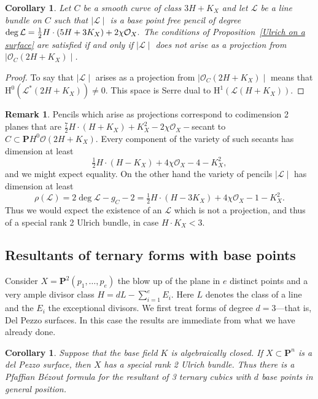 \documentclass{jams-l}
\newtheorem{corollary}[theorem]{Corollary}
\theoremstyle{definition}
\newtheorem{furtherwork}[theorem]{Remark}
\theoremstyle{remark}
\newcommand{\Hrm}{{\mathrm H}}
\newcommand{\cL}{{\mathcal L}}
\newcommand{\cO}{{\mathcal O}}
\newcommand{\PP}{{\mathbf P}}
\begin{document}
\begin{corollary} 
Let $C$ be a smooth curve of class $3H+K_X$ and let $\cL$ be a
\linebreak line
bundle on $C$ such that $\mid \cL \mid$ is a base point free pencil
of degree 
$
\deg \cL \linebreak = {1\over2} H\cdot(5H+3K_X) + 2\chi\cO_X.
$
The conditions of Proposition~\ref{Ulrich on a surface} are satisfied
if and only if $\mid \cL \mid$ does not arise as a projection
from $\mid \cO_C(2H+K_X) \mid$.
\end{corollary}

\begin{proof} To say that $\mid \cL \mid$ arises as a projection
from $\mid \cO_C(2H+K_X) \mid$ means that 
$\Hrm^0(\cL^*(2H+K_X))\neq 0$. 
This space is Serre dual to $\Hrm^1(\cL(H+K_X))$.
\end{proof}

\begin{furtherwork} Pencils which arise as projections correspond to
codimension 2 planes that are ${\frac72}H\cdot(H+K_X) + K_X^2 -2\chi\cO_X-$secant 
to $C \subset \PP H^0 \cO(2H+K_X)$. Every component of the variety
of such secants has dimension at least
\[ \tfrac12 H\cdot(H-K_X) + 4\chi \cO_X -4 -K_X^2, \]
and we might expect equality. On the other hand the variety of pencils
$\mid \cL \mid$ has dimension at least
\[
\rho(\cL) = 2 \deg \cL - g_C - 2 =\tfrac12 H\cdot(H-3K_X) + 4\chi \cO_X -1
-K_X^2.
\]
Thus we would
expect the existence of an $\cL$ which is not a projection,
and thus of a special rank 2 Ulrich bundle, in case 
$ 
H\cdot K_X < 3.
$  
\end{furtherwork}

\subsection*{Resultants of ternary forms with base points} 

Consider $X=\PP^2(p_1,\ldots,p_e)$ the
blow up of the plane in $e$ distinct points and a very ample
divisor class $H=dL-\sum_{i=1}^e E_i$. Here $L$ denotes the class of a
line and the $E_i$ the exceptional divisors.
We first treat forms of degree $d=3$---that is, Del Pezzo surfaces.
In this case the results are immediate from what we have already
done.

\begin{corollary}\label{del Pezzo} Suppose that the base field $K$ is
algebraically closed. If $X\subset \PP^n$ is a del Pezzo surface, then
$X$ has a special rank 2 Ulrich bundle. Thus there is a Pfaffian
B\'ezout formula for the resultant of 3 ternary cubics with
$d$ base points in general position.
\end{corollary}
\end{document}
